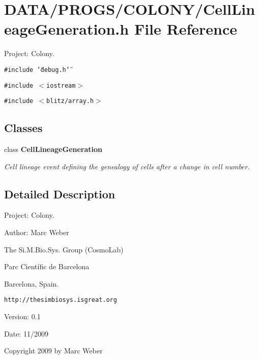 \section{DATA/PROGS/COLONY/CellLineageGeneration.h File Reference}
\label{CellLineageGeneration_8h}
Project: Colony. 

{\tt \#include \char`\"{}debug.h\char`\"{}}\par
{\tt \#include $<$iostream$>$}\par
{\tt \#include $<$blitz/array.h$>$}\par
\subsection*{Classes}
\begin{CompactItemize}
\item 
class {\bf CellLineageGeneration}
\begin{CompactList}\small\item\em Cell lineage event defining the genealogy of cells after a change in cell number. \item\end{CompactList}\end{CompactItemize}


\subsection{Detailed Description}
Project: Colony. 

\begin{Desc}
\item[Author:]Marc Weber\par
 The Si.M.Bio.Sys. Group (CosmoLab)\par
 Parc Científic de Barcelona\par
 Barcelona, Spain.\par
 {\tt http://thesimbiosys.isgreat.org} \end{Desc}
\begin{Desc}
\item[Version:]0.1 \end{Desc}
\begin{Desc}
\item[Date:]11/2009\end{Desc}
Copyright 2009 by Marc Weber 